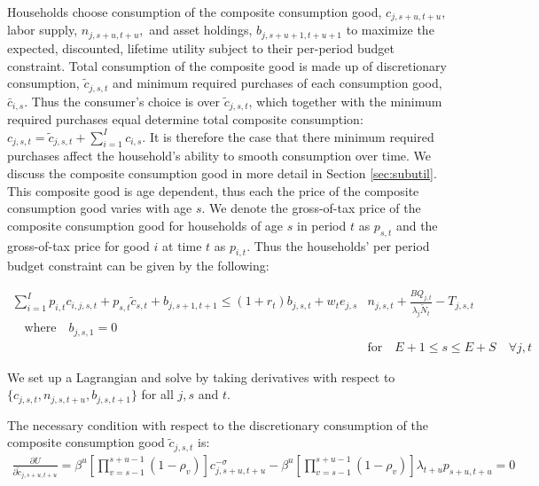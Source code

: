     Households choose consumption of the composite consumption good, $c_{j,s+u,t+u}$, labor supply, $n_{j,s+u,t+u},$ and asset holdings, $b_{j,s+u+1,t+u+1}$ to maximize the expected, discounted, lifetime utility subject to their per-period budget constraint.  Total consumption of the composite good is made up of discretionary consumption, $\tilde{c}_{j,s,t}$ and minimum required purchases of each consumption good, $\bar{c}_{i,s}$.  Thus the consumer's choice is over $\tilde{c}_{j,s,t}$, which together with the minimum required purchases equal determine total composite consumption: $c_{j,s,t}=\tilde{c}_{j,s,t}+\sum_{i=1}^{I}c_{i,s}$.  It is therefore the case that there minimum required purchases affect the household's ability to smooth consumption over time.  We discuss the composite consumption good in more detail in Section \ref{sec:subutil}.  This composite good is age dependent, thus each the price of the composite consumption good varies with age $s$.  We denote the gross-of-tax price of the composite consumption good for households of age $s$ in period $t$ as $p_{s,t}$ and the gross-of-tax price for good $i$ at time $t$ as $p_{i,t}$. Thus the households' per period budget constraint can be given by the following:
    
    \begin{equation}\label{EqBC}
      \begin{split}
        \sum_{i=1}^{I} p_{i,t}c_{i,j,s,t} + p_{s,t}\tilde{c}_{s,t} + b_{j,s+1,t+1} \leq \left(1 + r_t\right) b_{j,s,t} + w_t e_{j,s}&n_{j,s,t} + \frac{BQ_{j,t}}{\lambda_j\tilde{N}_t} - T_{j,s,t} \\
        \quad\text{where}\quad b_{j,s,1} = 0 \\
        &\text{for} \quad E+1\leq s \leq E+S \quad \forall j,t
      \end{split}
    \end{equation}

    We set up a Lagrangian and solve by taking derivatives with respect to $\{c_{j,s,t},n_{j,s,t+u},b_{j,s,t+1}\}$ for all $j,s$ and $t$.

      The necessary condition with respect to the discretionary consumption of the composite consumption good $\tilde{c}_{j,s,t}$ is:
    \begin{equation}\label{Eqcfoc}
      \begin{split}
      \frac{\partial U}{\partial \tilde{c}_{j,s+u,t+u}}  = \beta^u\left[\prod_{v=s-1}^{s+u-1}(1-\rho_v)\right] c_{j,s+u,t+u}^{-\sigma} - \beta^u\left[\prod_{v=s-1}^{s+u-1}(1-\rho_v)\right]  \lambda_{t+u} p_{s+u,t+u} = 0
        \end{split}
    \end{equation}

